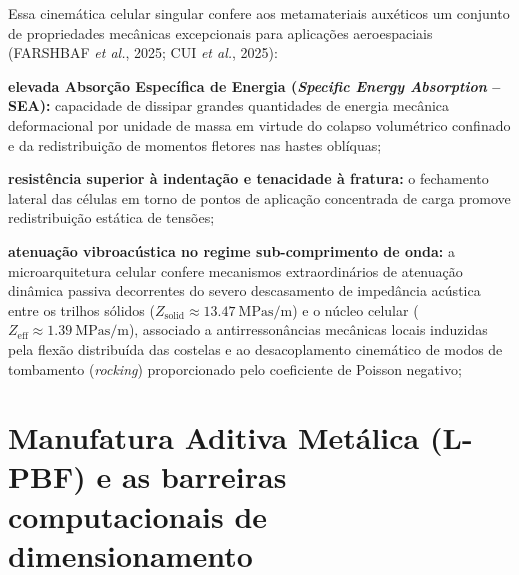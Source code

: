 Essa cinemática celular singular confere aos metamateriais auxéticos um conjunto de propriedades mecânicas excepcionais para aplicações aeroespaciais (FARSHBAF \textit{et al.}, 2025; CUI \textit{et al.}, 2025):
\begin{alineas}
  \item \textbf{elevada Absorção Específica de Energia (\textit{Specific Energy Absorption} -- SEA):} capacidade de dissipar grandes quantidades de energia mecânica deformacional por unidade de massa em virtude do colapso volumétrico confinado e da redistribuição de momentos fletores nas hastes oblíquas;
  \item \textbf{resistência superior à indentação e tenacidade à fratura:} o fechamento lateral das células em torno de pontos de aplicação concentrada de carga promove redistribuição estática de tensões;
  \item \textbf{atenuação vibroacústica no regime sub-comprimento de onda:} a microarquitetura celular confere mecanismos extraordinários de atenuação dinâmica passiva decorrentes do severo descasamento de impedância acústica entre os trilhos sólidos ($Z_{\text{solid}} \approx \SI{13.47}{\mega\pascal\second\per\metre}$) e o núcleo celular ($Z_{\text{eff}} \approx \SI{1.39}{\mega\pascal\second\per\metre}$), associado a antirressonâncias mecânicas locais induzidas pela flexão distribuída das costelas e ao desacoplamento cinemático de modos de tombamento (\textit{rocking}) proporcionado pelo coeficiente de Poisson negativo;
\end{alineas}

\section{Manufatura Aditiva Metálica (L-PBF) e as barreiras computacionais de dimensionamento}
\label{sec:intro-dfam-ia}

